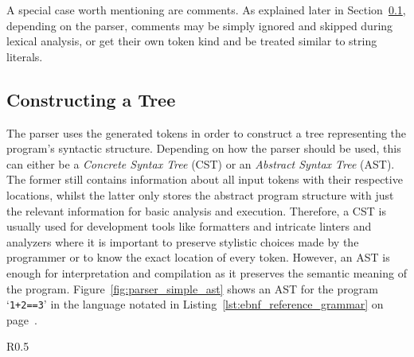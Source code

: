 A special case worth mentioning are comments.
As explained later in Section~\ref{sec:constructing_a_tree}, depending on the parser, comments may be simply ignored and skipped during lexical analysis, or get their own token kind and be treated similar to string literals.


\subsection{Constructing a Tree}\label{sec:constructing_a_tree}

The parser uses the generated tokens in order to construct a tree representing the program's syntactic structure.
Depending on how the parser should be used, this can either be a \emph{Concrete Syntax Tree} (CST) or an \emph{Abstract Syntax Tree} (AST).
The former still contains information about all input tokens with their respective locations, whilst the latter only stores the abstract program structure with just the relevant information for basic analysis and execution.
Therefore, a CST is usually used for development tools like formatters and intricate linters and analyzers where it is important to preserve stylistic choices made by the programmer or to know the exact location of every token.
However, an AST is enough for interpretation and compilation as it preserves the semantic meaning of the program.
Figure~\ref{fig:parser_simple_ast} shows an AST for the program `\Verb|1+2==3|' in the language notated in Listing~\ref{lst:ebnf_reference_grammar} on page~\pageref{lst:ebnf_reference_grammar}.

\begin{wrapfigure}{R}{0.5\textwidth}
    \centering
    \caption{Abstract Syntax Tree for `\texttt{1+2==3}'}\label{fig:parser_simple_ast}
\end{wrapfigure}


